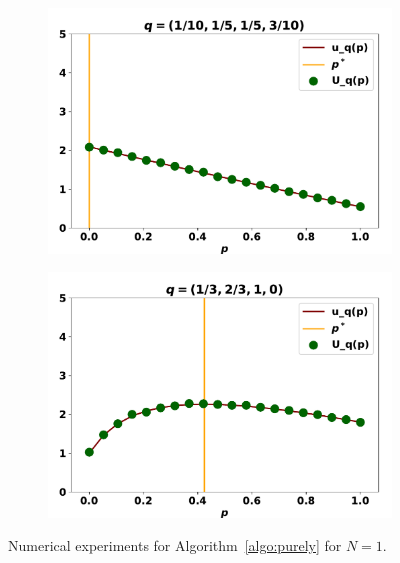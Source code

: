 \documentclass[10pt]{article}
\begin{document}
\begin{figure}
    \centering
    \begin{subfigure}{0.45\textwidth}
        \centering
        \includegraphics[width=.95\textwidth]{img/purely_random_match_one.pdf}
    \end{subfigure}
    \begin{subfigure}{0.45\textwidth}
        \centering
        \includegraphics[width=.95\textwidth]{img/purely_random_match_two.pdf}
    \end{subfigure}
    \caption{Numerical experiments for Algorithm~\ref{algo:purely} for \(N=1\).}
    \label{fig:purely_random_pairwise_results}
\end{figure}
\end{document}
